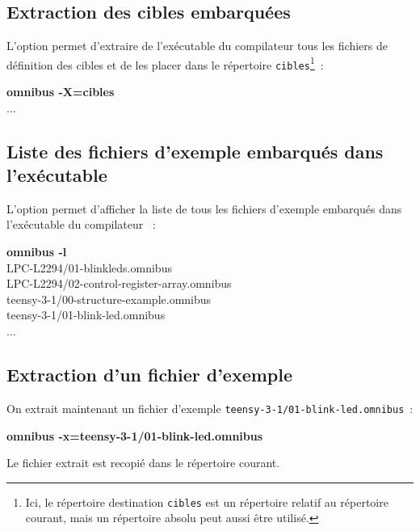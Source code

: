 \subsection{Extraction des cibles embarquées}
L'option  permet d'extraire de l'exécutable du compilateur tous les fichiers de définition des cibles et de les placer dans le répertoire \texttt{cibles}\footnote{Ici, le répertoire destination \texttt{cibles} est un répertoire relatif au répertoire courant, mais un répertoire absolu peut aussi être utilisé.}~:
\begin{SHELL}
{\bfseries omnibus -X=cibles}\\
\hspace*{1.2em}...
\end{SHELL}





\subsection{Liste des fichiers d'exemple embarqués dans l'exécutable}
L'option  permet d'afficher la liste de tous les fichiers d'exemple embarqués dans l'exécutable du compilateur ~:
\begin{SHELL}
{\bfseries omnibus -l}\\
\hspace*{1.2em}LPC-L2294/01-blinkleds.omnibus\\
\hspace*{1.2em}LPC-L2294/02-control-register-array.omnibus\\
\hspace*{1.2em}teensy-3-1/00-structure-example.omnibus\\
\hspace*{1.2em}teensy-3-1/01-blink-led.omnibus\\
\hspace*{1.2em}...
\end{SHELL}




\subsection{Extraction d'un fichier d'exemple}
On extrait maintenant un fichier d'exemple \texttt{teensy-3-1/01-blink-led.omnibus}~:
\begin{SHELL}
\bfseries omnibus -x=teensy-3-1/01-blink-led.omnibus
\end{SHELL}

Le fichier extrait est recopié dans le répertoire courant.






